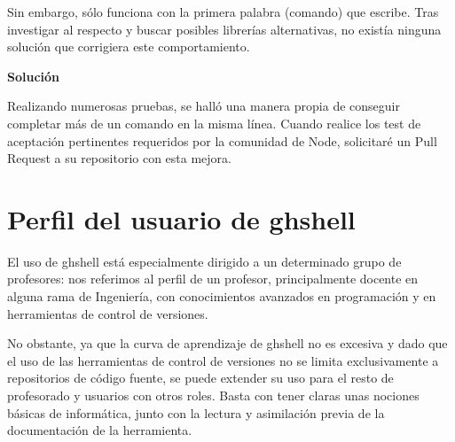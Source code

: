 Sin embargo, sólo funciona con la primera palabra (comando) que escribe. Tras investigar al respecto y buscar posibles librerías alternativas, no existía ninguna solución que corrigiera este comportamiento.
\bigskip

{\normalsize {\bfseries Solución}}
\bigskip

Realizando numerosas pruebas, se halló una manera propia de conseguir completar más de un comando en la misma línea. Cuando realice los test de aceptación pertinentes requeridos por la comunidad de Node, solicitaré un Pull Request a su repositorio con esta mejora.


\section{Perfil del usuario de ghshell}
\label{3:sec:4}

El uso de ghshell está especialmente dirigido a un determinado grupo de profesores: nos referimos al perfil de un profesor, principalmente docente en alguna rama de Ingeniería, con conocimientos avanzados en programación y en herramientas de control de versiones.

No obstante, ya que la curva de aprendizaje de ghshell no es excesiva y dado que el uso de las herramientas de control de versiones no se limita exclusivamente a repositorios de código fuente, se puede extender su uso para el resto de profesorado y usuarios con otros roles. Basta con tener claras unas nociones básicas de informática, junto con la lectura y asimilación previa de la documentación de la herramienta.
